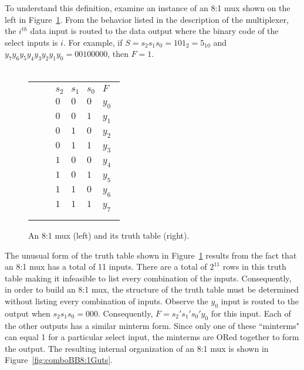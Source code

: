     To understand this definition, examine an
    instance of an 8:1 mux shown on the left in Figure~\ref{fig:comboBB8:1}.
    From the behavior listed in the description of the multiplexer,
    the $i^{th}$ data input is routed to the data
    output where the binary code of the select inputs is $i$.
    For example, if $S=s_2 s_1 s_0 = 101_2 = 5_{10}$  and
    $y_7 y_6 y_5 y_4 y_3 y_2 y_1 y_0 = 00100000$, then
    $F=1$.
    \\ \\
    \begin{figure}[ht]
        \begin{tabular}{p{1.5in}p{0.5in}l}
            \includegraphics[0mm,20mm][12mm,12mm]{8_1} & &
            $
            \begin{array}{c|c|c||c}
                s_2 & s_1 & s_0 & F \\ \hline
                0 & 0 & 0 & y_0 \\ \hline
                0 & 0 & 1 & y_1 \\ \hline
                0 & 1 & 0 & y_2 \\ \hline
                0 & 1 & 1 & y_3 \\ \hline
                1 & 0 & 0 & y_4 \\ \hline
                1 & 0 & 1 & y_5 \\ \hline
                1 & 1 & 0 & y_6 \\ \hline
                1 & 1 & 1 & y_7 \\
            \end{array}$
        \end{tabular}
        \caption{An 8:1 mux (left) and its truth table (right).}
        \label{fig:comboBB8:1}
    \end{figure}

    The unusual form of the truth table shown in Figure~\ref{fig:comboBB8:1}
    results from the fact that an 8:1 mux has a total of 11
    inputs.  There are a total of $2^{11}$ rows in this truth table
    making it infeasible to list every combination of the inputs.
    Consequently, in order to build an 8:1 mux, the structure of the truth table
    must be determined without
    listing every combination of inputs.  Observe the $y_0$ input is routed
    to the output when
    $s_2 s_1 s_0 = 000$.  Consequently, $F=s_2' s_1' s_0' y_0$
    for this input.  Each of the other outputs has a similar
    minterm form.  Since only one of these ``minterms" can equal
    1 for a particular select input, the minterms are ORed
    together to form the output. The resulting internal
    organization of an 8:1 mux is shown in Figure~\ref{fig:comboBB8:1Guts}.

